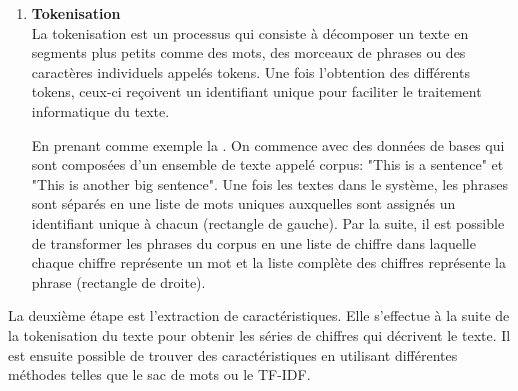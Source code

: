 \documentclass{rapport}
\begin{document}
\begin{enumerate}[listparindent=0pt, parsep=0pt]
    \item \textbf{Tokenisation}\\
    \label{token}
    La tokenisation est un processus qui consiste à décomposer un texte en segments plus petits comme des mots, des morceaux de phrases ou des caractères individuels appelés tokens. Une fois l'obtention des différents tokens, ceux-ci reçoivent un identifiant unique pour faciliter le traitement informatique du texte. 
    
    En prenant comme exemple la . On commence avec des données de bases qui sont composées d'un ensemble de texte appelé corpus: "This is a sentence" et "This is another big sentence". Une fois les textes dans le système, les phrases sont séparés en une liste de mots uniques auxquelles sont assignés un identifiant unique à chacun (rectangle de gauche). Par la suite, il est possible de transformer les phrases du corpus en une liste de chiffre dans laquelle chaque chiffre représente un mot et la liste complète des chiffres représente la phrase (rectangle de droite).
    
    
\end{enumerate}
La deuxième étape est l'extraction de caractéristiques. Elle s'effectue à la suite de la tokenisation du texte pour obtenir les séries de chiffres qui décrivent le texte. Il est ensuite possible de trouver des caractéristiques en utilisant différentes méthodes telles que le sac de mots ou le TF-IDF.
\end{document}
